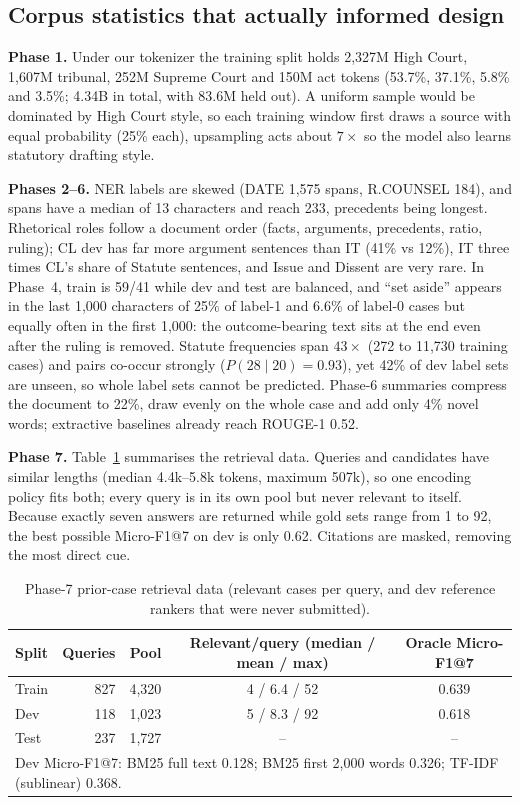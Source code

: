 \documentclass[11pt, oneside]{article}
\begin{document}
\subsection{Corpus statistics that actually informed design}
\textbf{Phase 1.} Under our tokenizer the training split holds 2,327M High Court, 1,607M tribunal, 252M Supreme Court and 150M act tokens (53.7\%, 37.1\%, 5.8\% and 3.5\%; 4.34B in total, with 83.6M held out). A uniform sample would be dominated by High Court style, so each training window first draws a source with equal probability (25\% each), upsampling acts about $7\times$ so the model also learns statutory drafting style.

\textbf{Phases 2--6.} NER labels are skewed (DATE 1,575 spans, R.COUNSEL 184), and spans have a median of 13 characters and reach 233, precedents being longest. Rhetorical roles follow a document order (facts, arguments, precedents, ratio, ruling); CL dev has far more argument sentences than IT (41\% vs 12\%), IT three times CL's share of Statute sentences, and Issue and Dissent are very rare. In Phase~4, train is 59/41 while dev and test are balanced, and ``set aside'' appears in the last 1,000 characters of 25\% of label-1 and 6.6\% of label-0 cases but equally often in the first 1,000: the outcome-bearing text sits at the end even after the ruling is removed. Statute frequencies span $43\times$ (272 to 11,730 training cases) and pairs co-occur strongly ($P(28\mid 20)=0.93$), yet 42\% of dev label sets are unseen, so whole label sets cannot be predicted. Phase-6 summaries compress the document to 22\%, draw evenly on the whole case and add only 4\% novel words; extractive baselines already reach ROUGE-1 0.52.

\textbf{Phase 7.} Table~\ref{tab:pcr} summarises the retrieval data. Queries and candidates have similar lengths (median 4.4k--5.8k tokens, maximum 507k), so one encoding policy fits both; every query is in its own pool but never relevant to itself. Because exactly seven answers are returned while gold sets range from 1 to 92, the best possible Micro-F1@7 on dev is only 0.62. Citations are masked, removing the most direct cue.

\begin{table}[t]
\centering\small
\caption{Phase-7 prior-case retrieval data (relevant cases per query, and dev reference rankers that were never submitted).}\label{tab:pcr}
\begin{tabular}{lrrcc}\toprule
Split & Queries & Pool & Relevant/query (median / mean / max) & Oracle Micro-F1@7 \\\midrule
Train & 827 & 4,320 & 4 / 6.4 / 52 & 0.639 \\
Dev & 118 & 1,023 & 5 / 8.3 / 92 & 0.618 \\
Test & 237 & 1,727 & -- & -- \\\midrule
\multicolumn{5}{l}{Dev Micro-F1@7: BM25 full text 0.128; BM25 first 2,000 words 0.326; TF-IDF (sublinear) 0.368.} \\\bottomrule
\end{tabular}
\end{table}
\end{document}
